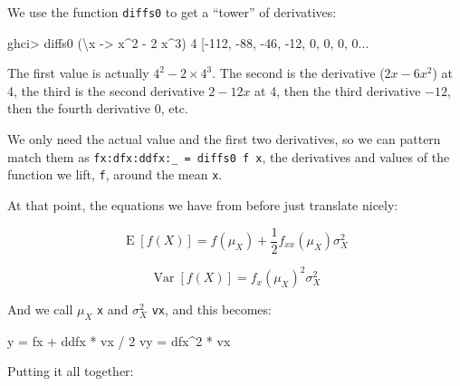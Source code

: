 \documentclass[]{article}
\newenvironment{Shaded}{}{}
\newcommand{\DecValTok}[1]{\textcolor[rgb]{0.25,0.63,0.44}{#1}}
\newcommand{\NormalTok}[1]{#1}
\newcommand{\OperatorTok}[1]{\textcolor[rgb]{0.40,0.40,0.40}{#1}}
\newcommand{\OtherTok}[1]{\textcolor[rgb]{0.00,0.44,0.13}{#1}}
\begin{document}
We use the function \texttt{diffs0} to get a ``tower'' of derivatives:

\begin{Shaded}
\begin{Highlighting}[]
\NormalTok{ghci}\OperatorTok{>}\NormalTok{ diffs0 (\textbackslash{}x }\OtherTok{{-}>}\NormalTok{ x}\OperatorTok{\^{}}\DecValTok{2} \OperatorTok{{-}} \DecValTok{2}\NormalTok{ x}\OperatorTok{\^{}}\DecValTok{3}\NormalTok{) }\DecValTok{4}
\NormalTok{[}\OperatorTok{{-}}\DecValTok{112}\NormalTok{, }\OperatorTok{{-}}\DecValTok{88}\NormalTok{, }\OperatorTok{{-}}\DecValTok{46}\NormalTok{, }\OperatorTok{{-}}\DecValTok{12}\NormalTok{, }\DecValTok{0}\NormalTok{, }\DecValTok{0}\NormalTok{, }\DecValTok{0}\NormalTok{, }\DecValTok{0}\OperatorTok{...}
\end{Highlighting}
\end{Shaded}

The first value is actually \(4^2 - 2 \times 4^3\). The second is the derivative
(\(2 x - 6x^2\)) at 4, the third is the second derivative \(2 - 12 x\) at 4,
then the third derivative \(-12\), then the fourth derivative \(0\), etc.

We only need the actual value and the first two derivatives, so we can pattern
match them as \texttt{fx:dfx:ddfx:\_\ =\ diffs0\ f\ x}, the derivatives and
values of the function we lift, \texttt{f}, around the mean \texttt{x}.

At that point, the equations we have from before just translate nicely:

\[
\operatorname{E}[f(X)] = f(\mu_X) + \frac{1}{2} f_{xx}(\mu_X) \sigma_X^2
\]

\[
\operatorname{Var}[f(X)] = f_x(\mu_X)^2 \sigma_X^2
\]

And we call \(\mu_X\) \texttt{x} and \(\sigma_X^2\) \texttt{vx}, and this
becomes:

\begin{Shaded}
\begin{Highlighting}[]
\NormalTok{y  }\OtherTok{=}\NormalTok{ fx }\OperatorTok{+}\NormalTok{ ddfx }\OperatorTok{*}\NormalTok{ vx }\OperatorTok{/} \DecValTok{2}
\NormalTok{vy }\OtherTok{=}\NormalTok{ dfx}\OperatorTok{\^{}}\DecValTok{2} \OperatorTok{*}\NormalTok{ vx}
\end{Highlighting}
\end{Shaded}

Putting it all together:
\end{document}
